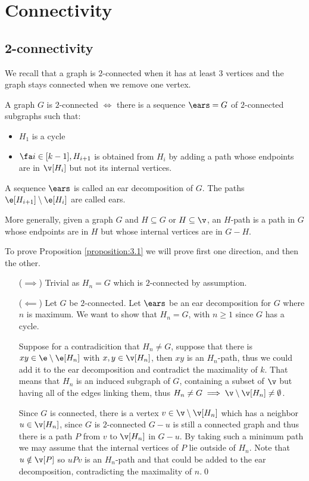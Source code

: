 \chapter{Connectivity}
\section{2-connectivity}
We recall that a graph is $2$-connected when it has at least $3$ vertices and the graph stays connected when we remove one vertex.
\begin{customproposition}{3.1}
\label{proposition:3.1}
    A graph $G$ is $2$-connected $\iff$ there is a sequence $\ears = G$ of $2$-connected subgraphs such that:
    \begin{itemize}
        \item $H_1$ is a cycle
        \item $\fa i \in [k - 1], H_{i + 1}$ is obtained from $H_i$ by adding a path whose endpoints are in $\v[H_i]$ but not its internal vertices.
    \end{itemize}
\end{customproposition}
\begin{definition}[Ears]
    A sequence $\ears$ is called an ear decomposition of $G$. The paths $\e[H_{i + 1}] \setminus \e[H_i]$ are called ears.
\end{definition}
More generally, given a graph $G$ and $H \subseteq G$ or $H \subseteq \v$, an $H$-path is a path in $G$ whose endpoints are in $H$ but whose internal vertices are in $G-H$.
\begin{prf}
    To prove Proposition \ref{proposition:3.1} we will prove first one direction, and then the other.
    \begin{itemize}
        \item [($\implies$)] Trivial as $H_n = G$ which is $2$-connected by assumption.
        \item [($\impliedby$)] Let $G$ be $2$-connected. Let $\ears$ be an ear decomposition for $G$ where $n$ is maximum. We want to show that $H_n = G$, with $n \geq 1$ since $G$ has a cycle.
        
        Suppose for a contradicition that $H_n \neq G$, suppose that there is $xy \in \e \setminus \e[H_n]$ with $x, y \in \v[H_n]$, then $xy$ is an $H_n$-path, thus we could add it to the ear decomposition and contradict the maximality of $k$. That means that $H_n$ is an induced subgraph of $G$, containing a subset of $\v$ but having all of the edges linking them, thus $H_n \neq G \implies \v \setminus \v[H_n] \neq \emptyset$.

        Since $G$ is connected, there is a vertex $v \in \v \setminus \v[H_n]$ which has a neighbor $u \in \v[H_n]$, since $G$ is $2$-connected $G - u$ is still a connected graph and thus there is a path $P$ from $v$ to $\v[H_n]$ in $G - u$. By taking such a minimum path we may assume that the internal vertices of $P$ lie outside of $H_n$. Note that $u \notin \v[P]$ so $uPv$ is an $H_n$-path and that could be added to the ear decomposition, contradicting the maximality of $n$.\qed
    \end{itemize}
\end{prf}
